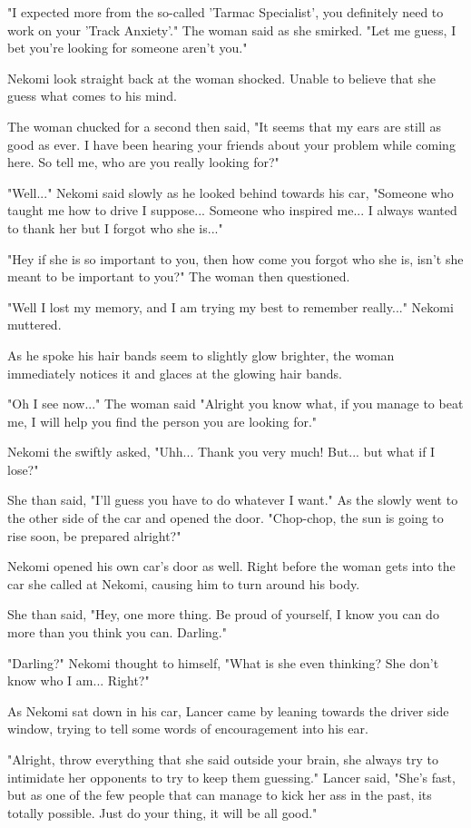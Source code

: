 "I expected more from the so-called 'Tarmac Specialist', you definitely need to work on your 'Track Anxiety'." The woman said as she smirked. "Let me guess, I bet you're looking for someone aren't you."

Nekomi look straight back at the woman shocked. Unable to believe that she guess what comes to his mind.

The woman chucked for a second then said, "It seems that my ears are still as good as ever. I have been hearing your friends about your problem while coming here. So tell me, who are you really looking for?"

"Well..." Nekomi said slowly as he looked behind towards his car, "Someone who taught me how to drive I suppose... Someone who inspired me... I always wanted to thank her but I forgot who she is..."

"Hey if she is so important to you, then how come you forgot who she is, isn't she meant to be important to you?" The woman then questioned.

"Well I lost my memory, and I am trying my best to remember really..." Nekomi muttered.

As he spoke his hair bands seem to slightly glow brighter, the woman immediately notices it and glaces at the glowing hair bands.

"Oh I see now..." The woman said "Alright you know what, if you manage to beat me, I will help you find the person you are looking for."

Nekomi the swiftly asked, "Uhh... Thank you very much! But... but what if I lose?"

She than said, "I'll guess you have to do whatever I want." As the slowly went to the other side of the car and opened the door. "Chop-chop, the sun is going to rise soon, be prepared alright?"

Nekomi opened his own car's door as well. Right before the woman gets into the car she called at Nekomi, causing him to turn around his body.

She than said, "Hey, one more thing. Be proud of yourself, I know you can do more than you think you can. Darling."

"Darling?" Nekomi thought to himself, "What is she even thinking? She don't know who I am... Right?"

As Nekomi sat down in his car, Lancer came by leaning towards the driver side window, trying to tell some words of encouragement into his ear.

"Alright, throw everything that she said outside your brain, she always try to intimidate her opponents to try to keep them guessing." Lancer said, "She's fast, but as one of the few people that can manage to kick her ass in the past, its totally possible. Just do your thing, it will be all good."

